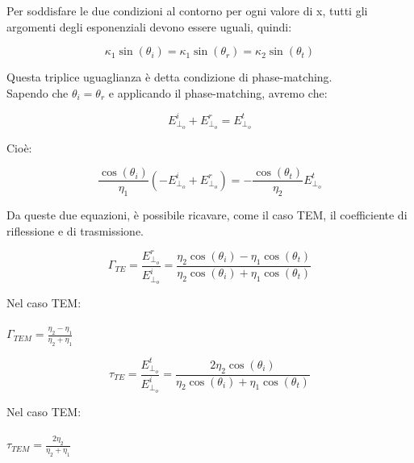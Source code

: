 Per soddisfare le due condizioni al contorno per ogni valore di x, tutti gli argomenti degli esponenziali devono essere uguali, quindi: 

{\Large \begin{equation}
    \kappa_1 \sin(\theta_i) = \kappa_1 \sin(\theta_r) = \kappa_2 \sin(\theta_t) 
\end{equation}}

Questa triplice uguaglianza è detta condizione di phase-matching. \\ 

Sapendo che $\theta_i = \theta_r$ e applicando il phase-matching, avremo che: 

{\Large \begin{equation}
    E_{\perp_o}^{i} + E_{\perp_o}^{r} = E_{\perp_o}^{t} 
\end{equation}} 

Cioè: 

{\Large \begin{equation}
    \frac{\cos(\theta_i)}{\eta_1} (- E_{\perp_o}^{i} + E_{\perp_o}^{r}) = 
    - \frac{\cos(\theta_t)}{\eta_2} E_{\perp_o}^{t}
\end{equation}}

Da queste due equazioni, è possibile ricavare, come il caso TEM, il coefficiente di riflessione e di trasmissione. 

{\Large \begin{equation}
    \Gamma_{TE} = \frac{E_{\perp_o}^{r}}{E_{\perp_o}^{i}} = \frac{\eta_2 \cos(\theta_i) - \eta_1 \cos(\theta_t)}{\eta_2 \cos(\theta_i) + \eta_1 \cos(\theta_t)}
\end{equation}}


\begin{tcolorbox}
    Nel caso TEM: \\ \\ $\Gamma_{TEM} = \frac{\eta_2 - \eta_1}{\eta_2 + \eta_1}$
\end{tcolorbox}


{\Large \begin{equation}
    \tau_{TE} = \frac{E_{\perp_o}^{t}}{E_{\perp_o}^{i}} = \frac{2 \eta_2 \cos(\theta_i) }{\eta_2 \cos(\theta_i) + \eta_1 \cos(\theta_t)}
\end{equation}}


\begin{tcolorbox}
    Nel caso TEM: \\ \\ $\tau_{TEM} = \frac{2 \eta_2}{\eta_2 + \eta_1}$
\end{tcolorbox}

